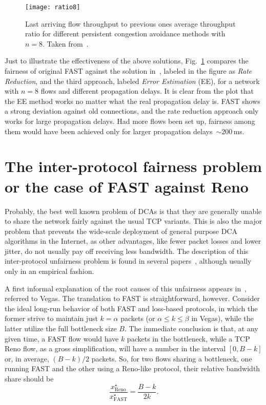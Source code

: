 \documentclass[english,times]{ettauth}
\begin{document}
\begin{figure}
  \centering
  \texttt{[image: ratio8]}
  \caption{Last arriving flow throughput to previous ones average throughput
    ratio for different persistent congestion avoidance methods with $n=8$.
    Taken from~\cite{Rperez08b}.}
  \label{fig:delay-impact}
\end{figure}
Just to illustrate the effectiveness of the above solutions,
Fig.~\ref{fig:delay-impact} compares the fairness of original FAST against the
solution in~\cite{Cui06}, labeled in the figure as \emph{Rate Reduction}, and
the third approach, labeled \emph{Error Estimation} (EE), for a network with
$n = 8$ flows and different propagation delays. It is clear from the plot that
the EE method works no matter what the real propagation delay is. FAST shows a
strong deviation against old connections, and the rate reduction approach only
works for large propagation delays. Had more flows been set up, fairness among
them would have been achieved only for larger propagation delays~$\sim 
200\,$ms.

\section{The inter-protocol fairness problem or the case of FAST against Reno}
\label{sec:parameter-tuning}

Probably, the best well known problem of DCAs is that they are generally
unable to share the network fairly against the usual TCP variants. This is
also the major problem that prevents the wide-scale deployment of general
purpose DCA algorithms in the Internet, as other advantages, like fewer packet
losses and lower jitter, do not usually pay off receiving less bandwidth. The
description of this inter-protocol unfairness problem is found in several
papers~\cite{Bonal99,Hengartner00,Mo99,Martin03}, although usually only in an
empirical fashion.

A first informal explanation of the root causes of this unfairness appears
in~\cite{Mo99}, referred to Vegas. The translation to FAST is straightforward,
however. Consider the ideal long-run behavior of both FAST and loss-based
protocols, in which the former strive to maintain just $k = \alpha$ packets
(or $\alpha \leq k \leq \beta$ in Vegas), while the latter utilize the full
bottleneck size $B$. The immediate conclusion is that, at any given time, a
FAST flow would have $k$ packets in the bottleneck, while a TCP Reno flow, as
a gross simplification, will have a number in the interval $[0, B - k]$ or, in
average, $(B - k)/2$ packets. So, for two flows sharing a bottleneck, one
running FAST and the other using a Reno-like protocol, their relative
bandwidth share should be
\begin{equation}
  \label{eq:reno-to-FAST-simple}
  \frac{x_{\mathrm{Reno}}^\star}{x_{\mathrm{FAST}}^\star}=\frac{B - k}{2k}.
\end{equation}
\end{document}
